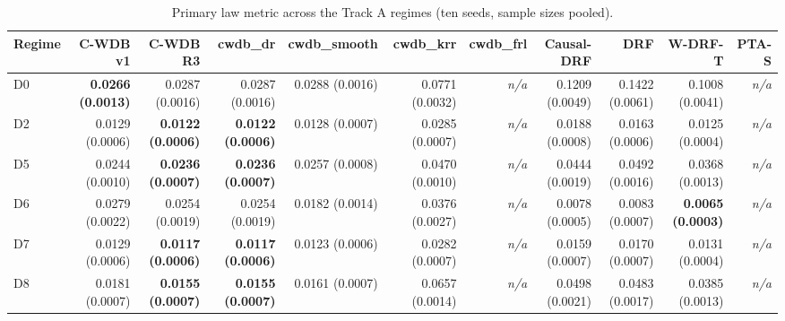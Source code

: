 \begin{table}[htbp]
\centering
\caption{Primary law metric across the Track A regimes (ten seeds, sample sizes pooled).}
\label{tab:p6-trackA-kernel_law_error}
\small
\begin{tabular}{@{}lrrrrrrrrrr@{}}
\toprule
Regime & C-WDB v1 & C-WDB R3 & cwdb\_dr & cwdb\_smooth & cwdb\_krr & cwdb\_frl & Causal-DRF & DRF & W-DRF-T & PTA-S \\ 
\midrule
D0 & \textbf{0.0266 (0.0013)} & 0.0287 (0.0016) & 0.0287 (0.0016) & 0.0288 (0.0016) & 0.0771 (0.0032) & \emph{n/a} & 0.1209 (0.0049) & 0.1422 (0.0061) & 0.1008 (0.0041) & \emph{n/a} \\ 
D2 & 0.0129 (0.0006) & \textbf{0.0122 (0.0006)} & \textbf{0.0122 (0.0006)} & 0.0128 (0.0007) & 0.0285 (0.0007) & \emph{n/a} & 0.0188 (0.0008) & 0.0163 (0.0006) & 0.0125 (0.0004) & \emph{n/a} \\ 
D5 & 0.0244 (0.0010) & \textbf{0.0236 (0.0007)} & \textbf{0.0236 (0.0007)} & 0.0257 (0.0008) & 0.0470 (0.0010) & \emph{n/a} & 0.0444 (0.0019) & 0.0492 (0.0016) & 0.0368 (0.0013) & \emph{n/a} \\ 
D6 & 0.0279 (0.0022) & 0.0254 (0.0019) & 0.0254 (0.0019) & 0.0182 (0.0014) & 0.0376 (0.0027) & \emph{n/a} & 0.0078 (0.0005) & 0.0083 (0.0007) & \textbf{0.0065 (0.0003)} & \emph{n/a} \\ 
D7 & 0.0129 (0.0006) & \textbf{0.0117 (0.0006)} & \textbf{0.0117 (0.0006)} & 0.0123 (0.0006) & 0.0282 (0.0007) & \emph{n/a} & 0.0159 (0.0007) & 0.0170 (0.0007) & 0.0131 (0.0004) & \emph{n/a} \\ 
D8 & 0.0181 (0.0007) & \textbf{0.0155 (0.0007)} & \textbf{0.0155 (0.0007)} & 0.0161 (0.0007) & 0.0657 (0.0014) & \emph{n/a} & 0.0498 (0.0021) & 0.0483 (0.0017) & 0.0385 (0.0013) & \emph{n/a} \\ 
\bottomrule
\end{tabular}
\end{table}


